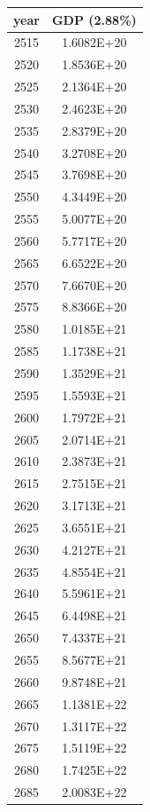 \documentclass[a4paper]{article}
\begin{document}
	\begin{tabular}{|c|c|}
		\hline
		year & GDP (2.88\%) \\
		\hline
		2515 & 1.6082E+20 \\
		\hline
		2520 & 1.8536E+20 \\
		\hline
		2525 & 2.1364E+20 \\
		\hline
		2530 & 2.4623E+20 \\
		\hline
		2535 & 2.8379E+20 \\
		\hline
		2540 & 3.2708E+20 \\
		\hline
		2545 & 3.7698E+20 \\
		\hline
		2550 & 4.3449E+20 \\
		\hline
		2555 & 5.0077E+20 \\
		\hline
		2560 & 5.7717E+20 \\
		\hline
		2565 & 6.6522E+20 \\
		\hline
		2570 & 7.6670E+20 \\
		\hline
		2575 & 8.8366E+20 \\
		\hline
		2580 & 1.0185E+21 \\
		\hline
		2585 & 1.1738E+21 \\
		\hline
		2590 & 1.3529E+21 \\
		\hline
		2595 & 1.5593E+21 \\
		\hline
		2600 & 1.7972E+21 \\
		\hline
		2605 & 2.0714E+21 \\
		\hline
		2610 & 2.3873E+21 \\
		\hline
		2615 & 2.7515E+21 \\
		\hline
		2620 & 3.1713E+21 \\
		\hline
		2625 & 3.6551E+21 \\
		\hline
		2630 & 4.2127E+21 \\
		\hline
		2635 & 4.8554E+21 \\
		\hline
		2640 & 5.5961E+21 \\
		\hline
		2645 & 6.4498E+21 \\
		\hline
		2650 & 7.4337E+21 \\
		\hline
		2655 & 8.5677E+21 \\
		\hline
		2660 & 9.8748E+21 \\
		\hline
		2665 & 1.1381E+22 \\
		\hline
		2670 & 1.3117E+22 \\
		\hline
		2675 & 1.5119E+22 \\
		\hline
		2680 & 1.7425E+22 \\
		\hline
		2685 & 2.0083E+22 \\

\end{tabular}
\end{document}
